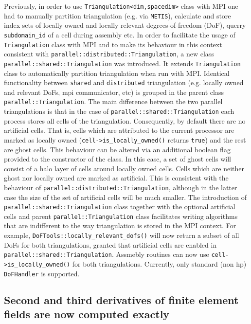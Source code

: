 \documentclass{ansarticle-preprint}
\begin{document}
Previously, in order to use \texttt{Triangulation<dim,spacedim>} class with MPI one had to manually
partition triangulation (e.g. via \texttt{METIS}), calculate and store index sets of locally owned and locally relevant degrees-of-freedom (DoF), querry \texttt{subdomain\_id}  of a cell during assembly etc.
In order to facilitate the usage of \texttt{Triangulation} class with MPI  
and to make its behaviour in this context consistent with \texttt{parallel::distributed::Triangulation}, a new class
\texttt{parallel::shared::Triangulation} was introduced. 
It extends \texttt{Triangulation} class to automatically partition triangulation when run with MPI.
Identical functionality between \texttt{shared} and \texttt{distributed} triangulation  
(e.g. locally owned and relevant DoFs, mpi communicator, etc)
is grouped in the parent class \texttt{parallel::Triangulation}.
The main difference between the two parallel triangulations is that in the case of 
\texttt{parallel::shared::Triangulation} each process stores all cells of the triangulation.
Consequently, by default there are no artificial cells. 
That is, cells which are attributed to the current processor are marked as locally owned 
(\texttt{cell->is\_locally\_owned()} returns \texttt{true}) 
and the rest are ghost cells.
This behaviour can be altered via an additional boolean flag provided to the constructor of the class. 
In this case, a set of ghost cells will consist of a halo layer of cells around locally owned cells.
Cells which are neither ghost nor locally owned are marked as artificial.
This is consistent with the behaviour of \texttt{parallel::distributed::Triangulation},
although in the latter case the size of the set of artificial cells will be much smaller.
The introduction of \texttt{parallel::shared::Triangulation} class together with the 
optional artificial cells and parent \texttt{parallel::Triangulation} class
facilitates writing
algorithms that are indifferent to the way triangulation is stored in the MPI context. 
For example, \texttt{DoFTools::locally\_relevant\_dofs()} will now return a subset of 
all DoFs for both triangulations, granted that artificial cells are enabled in 
\texttt{parallel::shared::Triangulation}.
Assmebly routines can now use \texttt{cell->is\_locally\_owned()} 
for both triangulations.
Currently, only standard (non hp) \texttt{DoFHandler} is supported.

\subsection{Second and third derivatives of finite element fields are now
  computed exactly}
\end{document}

